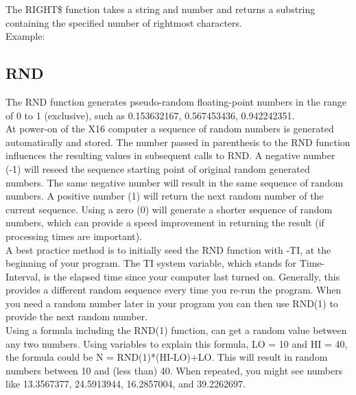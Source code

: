 The {\ttfamily RIGHT\$} function takes a string and number and returns a
substring containing the specified number of rightmost characters.\\

Example:\\


\subsection{RND}

The {\ttfamily RND} function generates pseudo-random floating-point numbers in
the range of 0 to 1 (exclusive), such as 0.153632167, 0.567453436,
0.942242351.\\

At power-on of the X16 computer a sequence of random numbers is generated
automatically and stored.  The number passed in parenthesis to the {\ttfamily
RND} function influences the resulting values in subsequent calls to {\ttfamily
RND}.  A negative number (-1) will reseed the sequence starting point of
original random generated numbers.  The same negative number will result in the
same sequence of random numbers.  A positive number (1) will return the next
random number of the current sequence.  Using a zero (0) will generate a
shorter sequence of random numbers, which can provide a speed improvement in
returning the result (if processing times are important).\\

A best practice method is to initially seed the {\ttfamily RND} function with
{\ttfamily -TI}, at the beginning of your program.  The {\ttfamily TI} system
variable, which stands for Time-Interval, is the elapsed time since your
computer last turned on.  Generally, this provides a different random sequence
every time you re-run the program.  When you need a random number later in your
program you can then use RND(1) to provide the next random number.\\

Using a formula including the {\ttfamily RND(1)} function, can get a random
value between any two numbers.  Using variables to explain this formula,
{\ttfamily LO = 10} and {\ttfamily HI = 40}, the formula could be {\ttfamily N
= RND(1)*(HI-LO)+LO}.  This will result in random numbers between 10 and (less
than) 40. When repeated, you might see numbers like 13.3567377, 24.5913944,
16.2857004, and 39.2262697.\\

